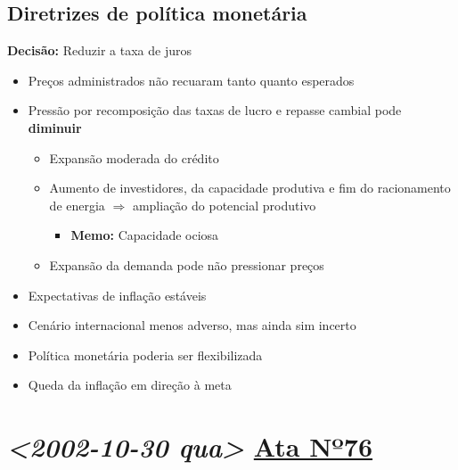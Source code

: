 \documentclass[11pt]{article}
\begin{document}
\subsection*{Diretrizes de política monetária}
\label{sec:org65bbd08}
\textbf{Decisão:} Reduzir a taxa de juros
\begin{itemize}
\item Preços administrados não recuaram tanto quanto esperados
\item Pressão por recomposição das taxas de lucro e repasse cambial pode \textbf{diminuir}
\begin{itemize}
\item Expansão moderada do crédito
\item Aumento de investidores, da capacidade produtiva e fim do racionamento de energia \(\Rightarrow\) ampliação do potencial produtivo
\begin{itemize}
\item \textbf{Memo:} Capacidade ociosa
\end{itemize}
\item Expansão da demanda pode não pressionar preços
\end{itemize}
\item Expectativas de inflação estáveis
\item Cenário internacional menos adverso, mas ainda sim incerto
\item Política monetária poderia ser flexibilizada
\item Queda da inflação em direção à meta
\end{itemize}

\section*{\textit{<2002-10-30 qua> } \href{https://www.bcb.gov.br/publicacoes/atascopom/01102002}{Ata Nº76}}
\label{sec:orgee24b0c}
\end{document}
